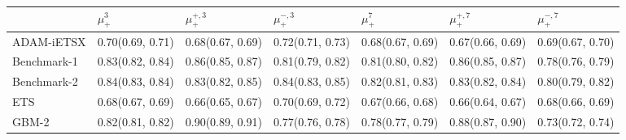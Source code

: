 \begin{tabular}{l p{} p{} p{} p{} p{} p{}}
\toprule
 & $\mu^{3}_+$ & $\mu^{+, 3}_+$ & $\mu^{-, 3}_+$ & $\mu^{7}_+$ & $\mu^{+, 7}_+$ & $\mu^{-, 7}_+$ \\
\midrule
ADAM-iETSX & {0.70\newline(0.69, 0.71)} & {0.68\newline(0.67, 0.69)} & {0.72\newline(0.71, 0.73)} & {0.68\newline(0.67, 0.69)} & {0.67\newline(0.66, 0.69)} & {0.69\newline(0.67, 0.70)} \\
Benchmark-1 & {0.83\newline(0.82, 0.84)} & {0.86\newline(0.85, 0.87)} & {0.81\newline(0.79, 0.82)} & {0.81\newline(0.80, 0.82)} & {0.86\newline(0.85, 0.87)} & {0.78\newline(0.76, 0.79)} \\
Benchmark-2 & {0.84\newline(0.83, 0.84)} & {0.83\newline(0.82, 0.85)} & {0.84\newline(0.83, 0.85)} & {0.82\newline(0.81, 0.83)} & {0.83\newline(0.82, 0.84)} & {0.80\newline(0.79, 0.82)} \\
ETS & {0.68\newline(0.67, 0.69)} & {0.66\newline(0.65, 0.67)} & {0.70\newline(0.69, 0.72)} & {0.67\newline(0.66, 0.68)} & {0.66\newline(0.64, 0.67)} & {0.68\newline(0.66, 0.69)} \\
GBM-2 & {0.82\newline(0.81, 0.82)} & {0.90\newline(0.89, 0.91)} & {0.77\newline(0.76, 0.78)} & {0.78\newline(0.77, 0.79)} & {0.88\newline(0.87, 0.90)} & {0.73\newline(0.72, 0.74)} \\

\end{tabular}
